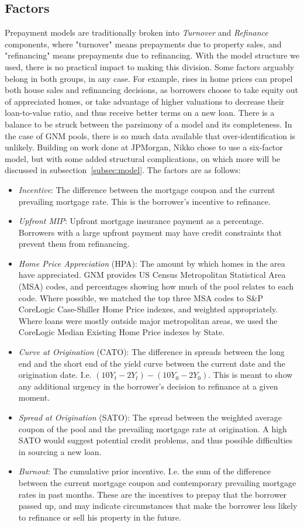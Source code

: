 \documentclass{article}
\begin{document}
\subsection{Factors}
Prepayment models are traditionally broken into \emph{Turnover} and \emph{Refinance} components, where "turnover" means prepayments due to property sales, and "refinancing" means prepayments due to refinancing. With the model structure we used, there is no practical impact to making this division. Some factors arguably belong in both groups, in any case. For example, rises in home prices can propel both house sales and refinancing decisions, as borrowers choose to take equity out of appreciated homes, or take advantage of higher valuations to decrease their loan-to-value ratio, and thus receive better terms on a new loan. 
There is a balance to be struck between the parsimony of a model and its completeness. In the case of GNM pools, there is so much data available that over-identification is unlikely. Building on work done at JPMorgan\cite{jpm_model}, Nikko chose to use a six-factor model, but with some added structural complications, on which more will be discussed in subsection~\ref{subsec:model}. The factors are as follows:
\begin{itemize}
	\item \emph{Incentive}:	The difference between the mortgage coupon and the current prevailing mortgage rate. This is the borrower's incentive to refinance.
	\item \emph{Upfront MIP}: Upfront mortgage insurance payment as a percentage. Borrowers with a large upfront payment may have credit constraints that prevent them from refinancing.
	\item \emph{Home Price Appreciation} (HPA): The amount by which homes in the area have appreciated. GNM provides US Census Metropolitan Statistical Area (MSA) codes, and percentages showing how much of the pool relates to each code. Where possible, we matched the top three MSA codes to S\&P CoreLogic Case-Shiller Home Price indexes, and weighted appropriately. Where loans were mostly outside major metropolitan areas, we used the CoreLogic Median Existing Home Price indexes by State.
	\item \emph{Curve at Origination} (CATO): The difference in spreads between the long end and the short end of the yield curve between the current date and the origination date. I.e. $(10Y_t - 2Y_t) - (10Y_0 - 2Y_0)$. This is meant to show any additional urgency in the borrower's decision to refinance at a given moment.
	\item \emph{Spread at Origination} (SATO): The spread between the weighted average coupon of the pool and the prevailing mortgage rate at origination. A high SATO would suggest potential credit problems, and thus possible difficulties in sourcing a new loan.
	\item \emph{Burnout}: The cumulative prior incentive. I.e. the sum of the difference between the current mortgage coupon and contemporary prevailing mortgage rates in past months. These are the incentives to prepay that the borrower passed up, and may indicate circumstances that make the borrower less likely to refinance or sell his property in the future.
\end{itemize}
\end{document}
